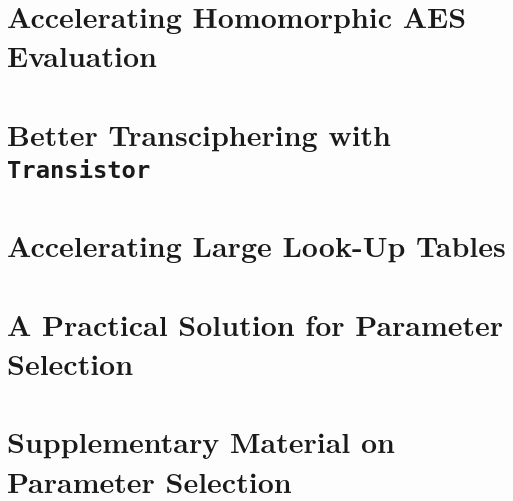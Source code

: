 \documentclass[11pt, twoside, openright]{thesis}
\begin{document}

\mainmatter















\cleardoublepage



\cleardoublepage















\chapter{Accelerating Homomorphic AES Evaluation}
\label{chap:hyppogriph}



\chapter[Better Transciphering with Transistor]{Better Transciphering with \texttt{Transistor}}
\label{chap:transistor}



\chapter{Accelerating Large Look-Up Tables}
\label{chap:larger_lut}



\chapter{A Practical Solution for Parameter Selection}
\label{chap:parameters}





\printbibliography



\appendix
\chapter{Supplementary Material on Parameter Selection}







\end{document}
